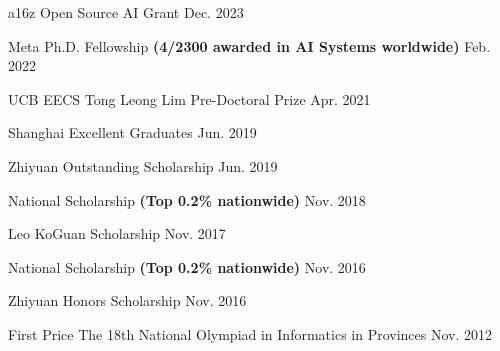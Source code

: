 
\begin{cvhonors}


\cvhonortop
{a16z Open Source AI Grant} %
{} %
{} %
{Dec. 2023} %

\cvhonortop
{Meta Ph.D. Fellowship \textbf{(4/2300 awarded in AI Systems worldwide)}} %
{} %
{} %
{Feb. 2022} %

\cvhonortop
{UCB EECS Tong Leong Lim Pre-Doctoral Prize} %
{} %
{} %
{Apr. 2021} %

\cvhonortop
{Shanghai Excellent Graduates} %
{} %
{} %
{Jun. 2019} %

\cvhonortop
{Zhiyuan Outstanding Scholarship} %
{} %
{} %
{Jun. 2019} %

\cvhonortop
{National Scholarship \textbf{(Top 0.2\% nationwide)}} %
{} %
{} %
{Nov. 2018} %

\cvhonortop
{Leo KoGuan Scholarship} %
{} %
{} %
{Nov. 2017} %


\cvhonortop
{National Scholarship \textbf{(Top 0.2\% nationwide)}} %
{} %
{} %
{Nov. 2016} %

\cvhonortop
{Zhiyuan Honors Scholarship} %
{} %
{} %
{Nov. 2016} %

\cvhonor
{First Price} %
{The 18th National Olympiad in Informatics in Provinces} %
{} %
{Nov. 2012} %

\end{cvhonors}
